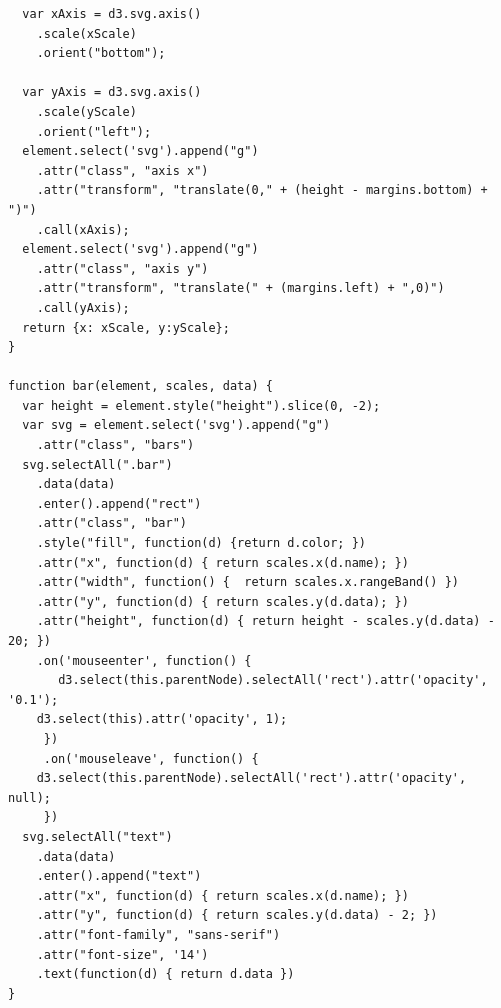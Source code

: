 \documentclass[a4paper,14pt]{extreport}
\begin{document}
\begin{lstlisting}
  var xAxis = d3.svg.axis()
    .scale(xScale)
    .orient("bottom");

  var yAxis = d3.svg.axis()
    .scale(yScale)
    .orient("left");
  element.select('svg').append("g")
    .attr("class", "axis x")
    .attr("transform", "translate(0," + (height - margins.bottom) + ")")
    .call(xAxis);
  element.select('svg').append("g")
    .attr("class", "axis y")
    .attr("transform", "translate(" + (margins.left) + ",0)")
    .call(yAxis);
  return {x: xScale, y:yScale};
}

function bar(element, scales, data) {
  var height = element.style("height").slice(0, -2);
  var svg = element.select('svg').append("g")
    .attr("class", "bars")
  svg.selectAll(".bar")
    .data(data)
    .enter().append("rect")
    .attr("class", "bar")
    .style("fill", function(d) {return d.color; })
    .attr("x", function(d) { return scales.x(d.name); })
    .attr("width", function() {  return scales.x.rangeBand() })
    .attr("y", function(d) { return scales.y(d.data); })
    .attr("height", function(d) { return height - scales.y(d.data) - 20; })
    .on('mouseenter', function() {
       d3.select(this.parentNode).selectAll('rect').attr('opacity', '0.1');
    d3.select(this).attr('opacity', 1);
     })
     .on('mouseleave', function() {
    d3.select(this.parentNode).selectAll('rect').attr('opacity', null);
     })
  svg.selectAll("text")
    .data(data)
    .enter().append("text")
    .attr("x", function(d) { return scales.x(d.name); })
    .attr("y", function(d) { return scales.y(d.data) - 2; })
    .attr("font-family", "sans-serif")
    .attr("font-size", '14')
    .text(function(d) { return d.data })
}
\end{lstlisting}
\end{document}
